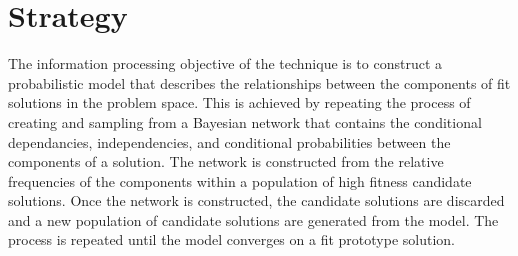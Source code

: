 \documentclass[a4paper, 11pt]{article}
\begin{document}

\section{Strategy}
\label{sec:strategy}
The information processing objective of the technique is to construct a probabilistic model that describes the relationships between the components of fit solutions in the problem space.
This is achieved by repeating the process of creating and sampling from a Bayesian network that contains the conditional dependancies, independencies, and conditional probabilities between the components of a solution. The network is constructed from the relative frequencies of the components within a population of high fitness candidate solutions. Once the network is constructed, the candidate solutions are discarded and a new population of candidate solutions are generated from the model. The process is repeated until the model converges on a fit prototype solution.
\end{document}
